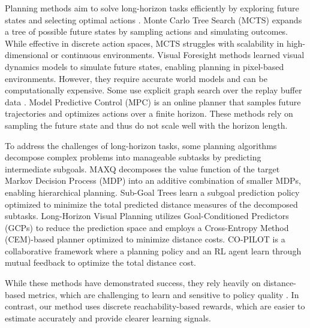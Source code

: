 Planning methods aim to solve long-horizon tasks efficiently by exploring future states and selecting optimal actions \cite{lavalle2006planning,choset2005principles}.
Monte Carlo Tree Search (MCTS) \cite{browne2012survey} expands a tree of possible future states by sampling actions and simulating outcomes.
While effective in discrete action spaces, MCTS struggles with scalability in high-dimensional or continuous environments.
Visual Foresight methods \cite{ebert2018visual,finn2017deep,hafner2019learning} learned visual dynamics models to simulate future states, enabling planning in pixel-based environments.
However, they require accurate world models and can be computationally expensive.
Some use explicit graph search over the replay buffer data \cite{eysenbach2019search}.
Model Predictive Control (MPC) \cite{nagabandi2018neural,nagabandi2020deep} is an online planner that samples future trajectories and optimizes actions over a finite horizon.
These methods rely on sampling the future state and thus do not scale well with the horizon length.

To address the challenges of long-horizon tasks, some planning algorithms decompose complex problems into manageable subtasks by predicting intermediate subgoals.
MAXQ \cite{dietterich2000hierarchical} decomposes the value function of the target Markov Decision Process (MDP) into an additive combination of smaller MDPs, enabling hierarchical planning.
Sub-Goal Trees \cite{jurgenson2020sub} learn a subgoal prediction policy optimized to minimize the total predicted distance measures of the decomposed subtasks.
Long-Horizon Visual Planning \cite{pertsch2020long} utilizes Goal-Conditioned Predictors (GCPs) to reduce the prediction space and employs a Cross-Entropy Method (CEM)-based planner optimized to minimize distance costs.
CO-PILOT \cite{ao2021co} is a collaborative framework where a planning policy and an RL agent learn through mutual feedback to optimize the total distance cost.

While these methods have demonstrated success, they rely heavily on distance-based metrics, which are challenging to learn and sensitive to policy quality \cite{eysenbach2019search,ao2021co}.
In contrast, our method uses discrete reachability-based rewards, which are easier to estimate accurately and provide clearer learning signals.


